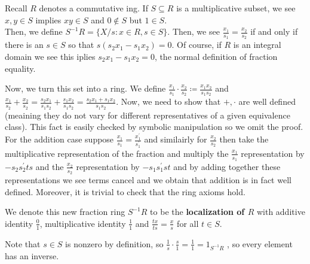 \begin{recall}
	Recall \(R\) denotes a commutative ing. If \(S \subseteq R\) is a multiplicative subset, we see \(x, y \in S\) implies \(xy\in S\) and \(0 \not\in S\) but \(1 \in S\).\\
	Then, we define \(S^{-1} R = \{X / s : x\in R, s \in S\} \). Then, we see \(\frac{x_1}{s_1} = \frac{x_2}{s_2}\) if and only if there is an \(s \in S\) so that \(s\left( s_2 x_1 - s_1 x_2 \right) = 0\). Of course, if \(R\) is an integral domain we see this iplies \(s_2 x_1 - s_1 x_2 = 0\), the normal definition of fraction equality.
\end{recall}
Now, we turn this set into a ring. We define \(\frac{x_1}{s_1}\cdot \frac{x_2}{s_2} \coloneqq \frac{x_1x_2}{s_1s_2}\) and \(\frac{x_1}{s_2} + \frac{x_2}{s_2} = \frac{s_2x_1}{s_1s_2} + \frac{s_1 x_2}{s_1 s_2} = \frac{s_2x_1 + s_1x_2}{s_1 s_2}\). Now, we need to show that \(+, \cdot\) are well defined (meaining they do not vary for different representatives of a given equivalence class). This fact is easily checked by symbolic manipulation so we omit the proof. For the addition case suppose \(\frac{x_1}{s_1} = \frac{x_1^{\prime}}{s_1^{\prime}}\) and similairly for \(\frac{x_2}{s_2}\) then take the multiplicative representation of the fraction and multiply the \(\frac{x_1}{s_1}\) representation by \(-s_2 s_2^{\prime} t s\) and the \(\frac{x_2}{s_2}\) representation by \(-s_1 s_1^{\prime} s t\) and by adding together these representations we see terms cancel and we obtain that addition is in fact well defined. Moreover, it is trivial to check that the ring axioms hold.
\begin{definition}
We denote this new fraction ring \(S^{-1} R\) to be the \textbf{localization of \(R\) } with additive identity \(\frac{0}{1}\), multiplicative identity \(\frac{1}{1}\) and \(\frac{tx}{ts}= \frac{x}{s}\) for all \(t \in S\).
\end{definition}
Note that \(s \in S\) is nonzero by definition, so \(\frac{1}{s} \cdot \frac{s}{1} = \frac{1}{1} = 1_{S^{-1} R}\) , so every element has an inverse.
